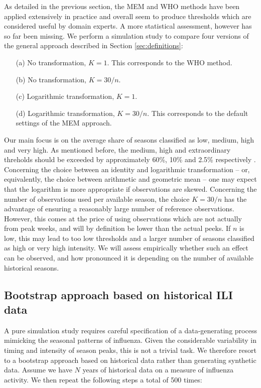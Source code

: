 \documentclass{article}
\begin{document}
As detailed in the previous section, the MEM and WHO methods have been applied extensively in practice and overall seem to produce thresholds which are considered useful by domain experts. A more statistical assessment, however has so far been missing. We perform a simulation study to compare four versions of the general approach described in Section \ref{sec:definitions}:
\begin{enumerate}
\item[(a)] No transformation, $K = 1$. This corresponds to the WHO method.
\item[(b)] No transformation, $K = 30/n$.
\item[(c)] Logarithmic transformation, $K = 1$.
\item[(d)] Logarithmic transformation, $K = 30/n$. This corresponds to the default settings of the MEM approach.
\end{enumerate}

Our main focus is on the average share of seasons classified as low, medium, high and very high. As mentioned before, the medium, high and extraordinary threholds should be exceeded by approximately 60\%, 10\% and 2.5\% respectively \citep{WHO2017}. Concerning the choice between an identity and logarithmic transformation -- or, equivalently, the choice between arithmetic and geometric mean -- one may expect that the logarithm is more appropriate if observations are skewed. Concerning the number of observations used per available season, the choice $K = 30/n$ has the advantage of ensuring a reasonably large number of reference observations. However, this comes at the price of using observations which are not actually from peak weeks, and will by definition be lower than the actual peeks. If $n$ is low, this may lead to too low thresholds and a larger number of seasons classified as high or very high intensity. We will assess empirically whether such an effect can be observed, and how pronounced it is depending on the number of available historical seasons.

\subsection{Bootstrap approach based on historical ILI data}

A pure simulation study requires careful specification of a data-generating process mimicking the seasonal patterns of influenza. Given the considerable variability in timing and intensity of season peaks, this is not a trivial task. We therefore resort to a bootstrap approach based on historical data rather than generating synthetic data. Assume we have $N$ years of historical data on a measure of influenza activity. We then repeat the following steps a total of 500 times:
\end{document}
